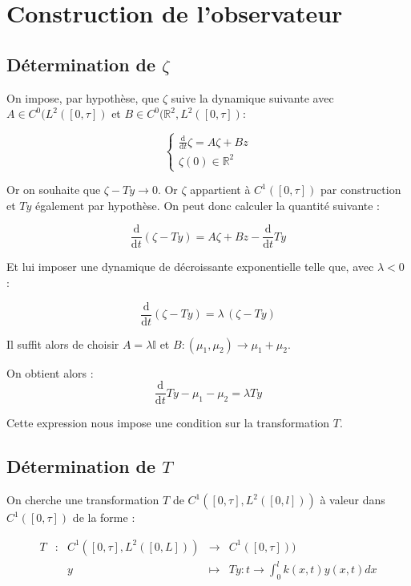 \documentclass[a4paper]{article}
\begin{document}
\section{Construction de l'observateur}

\subsection{Détermination de $\zeta$}

On impose, par hypothèse, que $\zeta$ suive la dynamique suivante 
avec $A \in C^0 (L^2([0,\tau])$ 
et $B \in C^0(\mathbb{R}^2,L^2([0,\tau])$:

\begin{equation}
\label{eq:tildez}
\begin{cases}
 \frac{\mathrm{d}}{\mathrm{d}t} \zeta = A \zeta + Bz\\
 \zeta(0) \in \mathbb{R}^2 
\end{cases}
\end{equation}


Or on souhaite que $ \zeta - Ty \to 0$. Or $\zeta$ appartient à $C^1([0,\tau])$
par construction et $Ty$ également par hypothèse. 
On peut donc calculer la quantité suivante :

\[ 
\frac{\mathrm{d}}{\mathrm{d}t}(\zeta -Ty) = A\zeta +Bz-\frac{\mathrm{d}}{\mathrm{d}t}Ty
\]

Et lui imposer une dynamique de décroissante exponentielle  telle que, avec $\lambda <0$ :

\[
\frac{\mathrm{d}}{\mathrm{d}t}(\zeta -Ty) = \lambda \, (\zeta -Ty)
\]

Il suffit alors de choisir $A=\lambda \mathbb{I}$ et $B:(\mu_1,\mu_2) \to \mu_1 + \mu_2 $. 

On obtient alors :
\[ \frac{\mathrm{d}}{\mathrm{d}t}Ty - \mu_1 - \mu_2 = \lambda Ty \]

Cette expression nous impose une condition sur la transformation $T$.


\subsection{Détermination de $T$}

On cherche une transformation $T$ de $C^1([0,\tau],L^2([0,l]))$ à valeur dans $C^1([0,\tau])$ de la forme :

\begin{equation}
	\label{kern}
	\begin{array}{ccccc}
	T & : & C^1([0,\tau],L^2([0,L])) & \to & C^1([0,\tau])) \\
	 & & y & \mapsto & Ty:t \to \int_0^l k(x,t) y(x,t) dx\\
	\end{array}
\end{equation}
\end{document}
